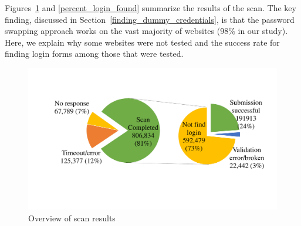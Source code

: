 






Figures~\ref{scan_success} and \ref{percent_login_found} summarize the results of the scan.  The key finding, discussed in Section~\ref{finding_dummy_credentials}, is that the password swapping approach works on the vast majority of websites (98\% in our study).  Here, we explain why some websites were not tested and the success rate for finding login forms among those that were tested.

\begin{figure}[bt]
\centering
\includegraphics[width=0.95\linewidth]{scan_success.pdf}
\caption{Overview of scan results}
\label{scan_success}
\end{figure}

